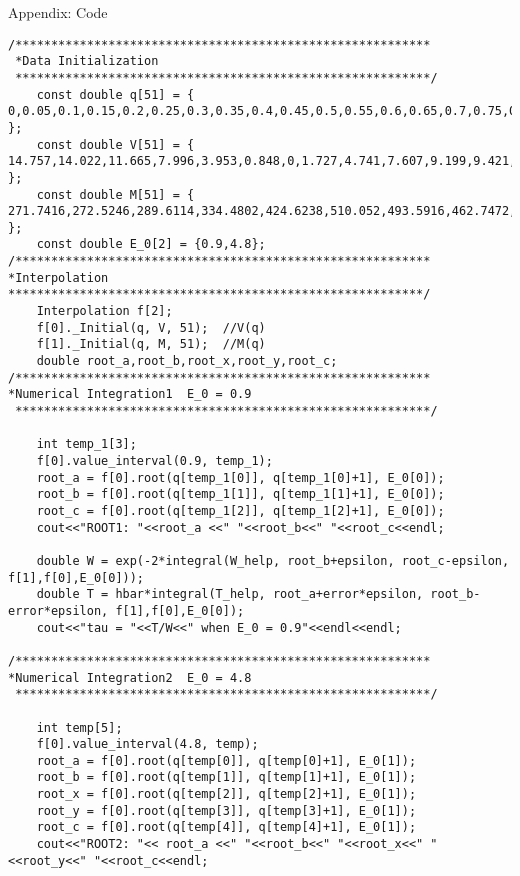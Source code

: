 \documentclass[letterpaper,12pt]{article}
\begin{document}
\begin{section}{Appendix: Code}
\begin{lstlisting}
/**********************************************************
 *Data Initialization
 **********************************************************/
    const double q[51] = { 0,0.05,0.1,0.15,0.2,0.25,0.3,0.35,0.4,0.45,0.5,0.55,0.6,0.65,0.7,0.75,0.8,0.85,0.9,0.95,1,1.05,1.1,1.15,1.2,1.25,1.3,1.35,1.4,1.45,1.5,1.55,1.6,1.65,1.7,1.75,1.8,1.85,1.9,1.95,2,2.05,2.1,2.15,2.2,2.25,2.3,2.35,2.4,2.45,2.5 };
    const double V[51] = { 14.757,14.022,11.665,7.996,3.953,0.848,0,1.727,4.741,7.607,9.199,9.421,8.751,7.503,5.879,4.185,3,2.655,3.036,3.799,4.693,5.57,6.281,6.602,6.697,6.654,6.337,6.263,5.425,5.421,4.961,4.541,4.153,3.76,3.393,2.885,2.441,2.042,1.69,1.405,1.079,0.844,0.635,0.59,0.393,0.112,-0.339,-0.218,-0.329,-0.667,-1.097 };
    const double M[51] = { 271.7416,272.5246,289.6114,334.4802,424.6238,510.052,493.5916,462.7472,364.1124,246.5,275.471,327.9146,317.6718,315.2416,332.7344,323.2862,328.7846,308.0322,270.7788,272.8552,210.888,186.1278,193.7258,201.376,186.2902,189.196,157.1452,201.3586,214.687,218.3236,230.8458,228.404,227.9806,222.401,220.5856,221.241,203.5452,239.7198,261.3016,279.618,184.3646,183.4018,175.2644,173.0314,170.9782,163.2932,160.109,159.8074,157.5744,305.486,296.9339 };
    const double E_0[2] = {0.9,4.8};
/**********************************************************
*Interpolation
**********************************************************/
    Interpolation f[2];
    f[0]._Initial(q, V, 51);  //V(q)
    f[1]._Initial(q, M, 51);  //M(q)
    double root_a,root_b,root_x,root_y,root_c;
/**********************************************************
*Numerical Integration1  E_0 = 0.9
 **********************************************************/
    
    int temp_1[3];
    f[0].value_interval(0.9, temp_1);
    root_a = f[0].root(q[temp_1[0]], q[temp_1[0]+1], E_0[0]);
    root_b = f[0].root(q[temp_1[1]], q[temp_1[1]+1], E_0[0]);
    root_c = f[0].root(q[temp_1[2]], q[temp_1[2]+1], E_0[0]);
    cout<<"ROOT1: "<<root_a <<" "<<root_b<<" "<<root_c<<endl;

    double W = exp(-2*integral(W_help, root_b+epsilon, root_c-epsilon, f[1],f[0],E_0[0]));
    double T = hbar*integral(T_help, root_a+error*epsilon, root_b-error*epsilon, f[1],f[0],E_0[0]);
    cout<<"tau = "<<T/W<<" when E_0 = 0.9"<<endl<<endl;
 
/**********************************************************
*Numerical Integration2  E_0 = 4.8
 **********************************************************/

    int temp[5];
    f[0].value_interval(4.8, temp);
    root_a = f[0].root(q[temp[0]], q[temp[0]+1], E_0[1]);
    root_b = f[0].root(q[temp[1]], q[temp[1]+1], E_0[1]);
    root_x = f[0].root(q[temp[2]], q[temp[2]+1], E_0[1]);
    root_y = f[0].root(q[temp[3]], q[temp[3]+1], E_0[1]);
    root_c = f[0].root(q[temp[4]], q[temp[4]+1], E_0[1]);
    cout<<"ROOT2: "<< root_a <<" "<<root_b<<" "<<root_x<<" "<<root_y<<" "<<root_c<<endl;
    

\end{lstlisting}
\end{section}
\end{document}
